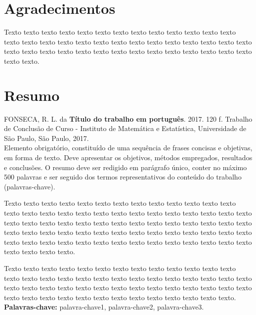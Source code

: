 \chapter*{Agradecimentos}

Texto texto texto texto texto texto texto texto texto texto texto texto texto
texto texto texto texto texto texto texto texto texto texto texto texto texto
texto texto texto texto texto texto texto texto texto texto texto texto texto
texto texto texto texto.

\chapter*{Resumo}

\noindent%
FONSECA, R. L. da \textbf{Título do trabalho em português}. 2017. 120 f. Trabalho de Conclusão de Curso
 - Instituto de Matemática e Estatística, Universidade de São Paulo,
São Paulo, 2017.
\\

Elemento obrigatório, constituído de uma sequência de frases concisas e
objetivas, em forma de texto.  Deve apresentar os objetivos, métodos empregados,
resultados e conclusões.  O resumo deve ser redigido em parágrafo único, conter
no máximo 500 palavras e ser seguido dos termos representativos do conteúdo do
trabalho (palavras-chave).

Texto texto texto texto texto texto texto texto texto texto texto texto texto
texto texto texto texto texto texto texto texto texto texto texto texto texto
texto texto texto texto texto texto texto texto texto texto texto texto texto
texto texto texto texto texto texto texto texto texto texto texto texto texto
texto texto texto texto texto texto texto texto texto texto texto texto texto
texto texto texto texto texto texto texto texto.

Texto texto texto texto texto texto texto texto texto texto texto texto texto
texto texto texto texto texto texto texto texto texto texto texto texto texto
texto texto texto texto texto texto texto texto texto texto texto texto texto
texto texto texto texto texto texto texto texto texto texto texto texto texto
texto texto.
\\

\noindent%
\textbf{Palavras-chave:} palavra-chave1, palavra-chave2, palavra-chave3.
